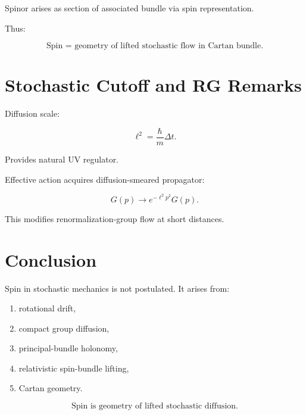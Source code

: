 \documentclass[12pt]{article}
\begin{document}
Spinor arises as section of associated bundle
via spin representation.

Thus:

\[
\boxed{
\text{Spin = geometry of lifted stochastic flow in Cartan bundle}.
}
\]

\section{Stochastic Cutoff and RG Remarks}

Diffusion scale:

\[
\ell^2 = \frac{\hbar}{m}\Delta t.
\]

Provides natural UV regulator.

Effective action acquires diffusion-smeared propagator:

\[
G(p)\to e^{-\ell^2 p^2}G(p).
\]

This modifies renormalization-group flow at short distances.

\section{Conclusion}

Spin in stochastic mechanics is not postulated.
It arises from:

\begin{enumerate}
\item rotational drift,
\item compact group diffusion,
\item principal-bundle holonomy,
\item relativistic spin-bundle lifting,
\item Cartan geometry.
\end{enumerate}

\[
\boxed{
\text{Spin is geometry of lifted stochastic diffusion.}
}
\]
\end{document}
